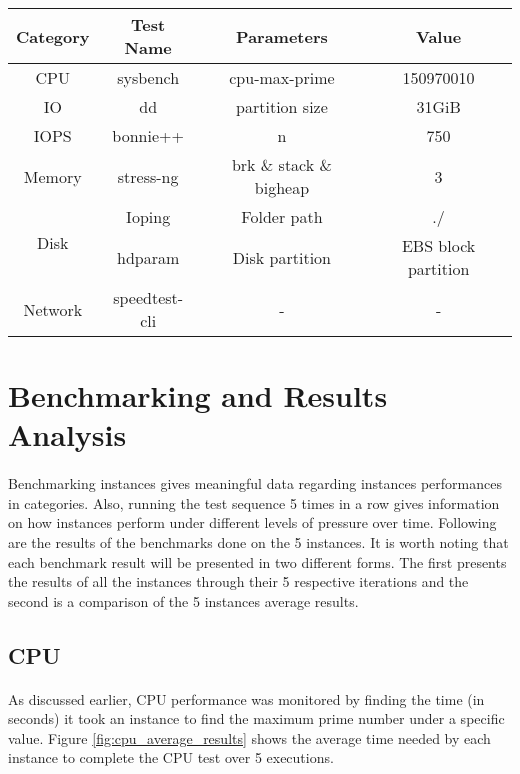 \documentclass[11pt]{article}
\begin{document}
		\begin{center}
			 \label{tab:regression_analysis_summary}	
			\begin{tabular}{|*{4}{c|}}
				\hline
				\textbf{Category} & \textbf{Test Name} & \textbf{Parameters} & \textbf{Value} \\
				 \hline
				CPU & sysbench & cpu-max-prime & 150970010 \\
				 \hline
				IO & dd & partition size & 31GiB \\
				 \hline
				IOPS & bonnie++ & n & 750 \\
				 \hline
				Memory & stress-ng & brk \& stack \& bigheap & 3 \\
				 \hline
				\multirow{2}{*}{Disk} & Ioping & Folder path & ./ \\\cline{2-4}
				& hdparam & Disk partition & EBS block partition \\
				\hline
				Network & speedtest-cli & - & - \\
				 \hline
			\end{tabular}
		\end{center}
		\pagebreak

\section{Benchmarking and Results Analysis} \label{sec:benchmarking_and_results_analysis}
	\paragraph{} Benchmarking instances gives meaningful data regarding instances performances in
	categories. Also, running the test sequence 5 times in a row gives information
	on how instances perform under different levels of pressure over time. Following
	are the results of the benchmarks done on the 5 instances. It
	is worth noting that each benchmark result will be presented in two different
	forms. The first presents the results of all the instances through their 5 respective
	iterations and the second is a comparison of the 5 instances average results.
	
	\subsection{CPU}
		\paragraph{} As discussed earlier, CPU performance was monitored by finding the time (in
		seconds) it took an instance to find the maximum prime number under a
		specific value. Figure \ref{fig:cpu_average_results} shows the average time needed by each instance to complete
		the CPU test over 5 executions.
\end{document}
